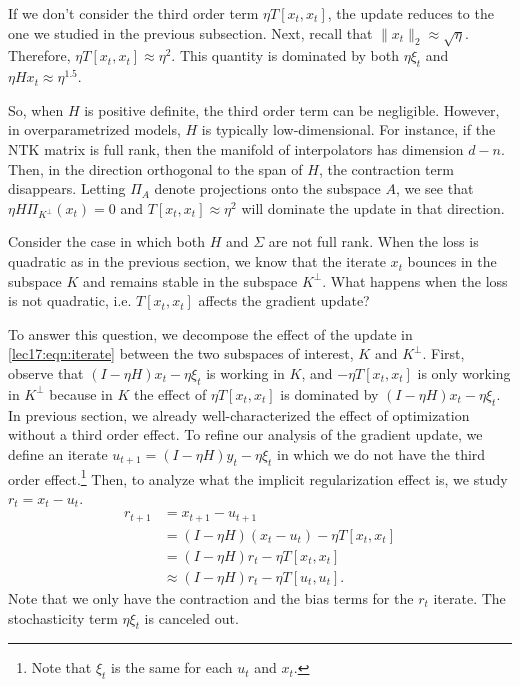 If we don't consider the third order term $\eta T [x_t,x_t]$, the update reduces to the one we studied in the previous subsection. Next, recall that $\|x_t\|_2 \approx \sqrt{\eta}$. Therefore, $\eta T[x_t,x_t] \approx \eta^2$. This quantity is dominated by both $\eta \xi_t$ and $\eta Hx_t \approx {\eta}^{1.5}$. 

So, when $H$ is positive definite, the third order term can be negligible. However, in overparametrized models, $H$ is typically low-dimensional. For instance, if the NTK matrix is full rank, then the manifold of interpolators has dimension $d-n$. Then, in the direction orthogonal to the span of $H$, the contraction term disappears. Letting $\Pi_{A}$ denote projections onto the subspace $A$, we see that $\eta H \Pi_{K^\perp}(x_t) = 0$ and $T[x_t,x_t] \approx \eta^2$ will dominate the update in that direction.

Consider the case in which both $H$ and $\Sigma$ are not full rank. When the loss is quadratic as in the previous section, we know that the iterate $x_t$ bounces in the subspace $K$ and remains stable in the subspace $K^\perp$. What happens when the loss is not quadratic, i.e. $T[x_t,x_t]$ affects the gradient update? 

To answer this question, we decompose the effect of the update in \eqref{lec17:eqn:iterate} between the two subspaces of interest, $K$ and $K^\perp$. First, observe that $(I-\eta H)x_t - \eta \xi_t$ is working in $K$, and $- \eta T [x_t,x_t]$ is only working in $K^\perp$ because in $K$ the effect of $\eta T [x_t,x_t]$ is dominated by $(I-\eta H)x_t - \eta \xi_t$. In previous section, we already well-characterized the effect of optimization without a third order effect. To refine our analysis of the gradient update, we define an iterate $u_{t+1} = (I - \eta H)y_t - \eta \xi_t$ in which we do not have the third order effect.\footnote{Note that $\xi_t$ is the same for each $u_t$ and $x_t$.} Then, to analyze what the implicit regularization effect is, we study $r_t = x_t - u_t$.
\begin{align*}
r_{t + 1} &= x_{t+1} - u_{t+1}\\
&= (I-\eta H)(x_t - u_t) - \eta T[x_t,x_t]\\
&= (I-\eta H)r_t - \eta T[x_t,x_t]\\
&\approx (I-\eta H)r_t - \eta T[u_t,u_t].
\end{align*}
Note that we only have the contraction and the bias terms for the $r_t$ iterate. The stochasticity term $\eta \xi_t$ is canceled out. 

